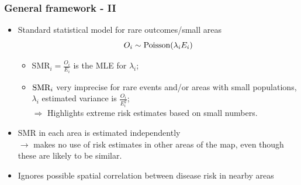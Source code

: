 \documentclass[slidestop,compress,serif,10pt]{beamer}
\begin{document}
\begin{frame}\frametitle{General framework - II}
\begin{itemize}
\item Standard statistical model for rare outcomes/small areas
\begin{equation*} O_i \sim \hbox{Poisson}(\lambda_i E_i) \end{equation*}
 
 \begin{itemize}
 \item SMR$_i= \frac{O_i}{E_i}$ is the MLE for $\lambda_i$;
\item $\hbox{SMR}_i$ very imprecise for rare events and/or areas with small populations, $\lambda_i$ estimated variance is $\frac{O_i}{E_i^2}$;\\
$\Rightarrow$ Highlights extreme risk estimates based on small numbers.
    \end{itemize}
\vspace{0.2cm}
\pause\item SMR in each area is estimated independently\\
$\rightarrow$ makes no use of risk estimates in other areas of the map, even though these are likely to be similar.
\vspace{0.2cm}
\item Ignores possible spatial correlation between disease risk in nearby areas 
\end{itemize}

\pause\centering\color{red}{Bayesian `smoothing' estimators in a hierarchical formulation.}

\end{frame}
\end{document}
